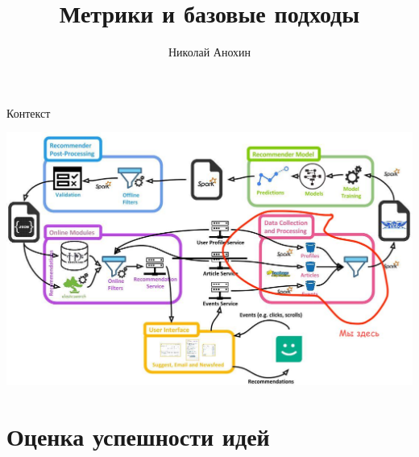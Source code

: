 \documentclass[11pt,aspectratio=169,handout]{beamer}
\author{Николай Анохин}
\title{Метрики и базовые подходы}
\begin{document}
{

\begin{frame}
\titlepage
\end{frame}

}

\begin{frame}{Контекст}

\begin{center}
\includegraphics[scale=0.23]{images/mendeley.jpeg}
\end{center}

\end{frame}

\section{Оценка успешности идей}
\end{document}
